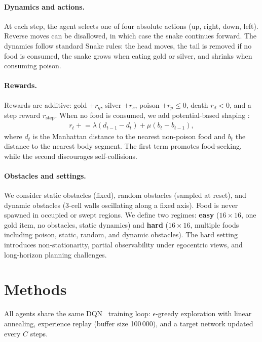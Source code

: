 \documentclass[runningheads]{llncs}
\begin{document}
\paragraph{Dynamics and actions.}
At each step, the agent selects one of four absolute actions (up, right, down,
left). Reverse moves can be disallowed, in which case the snake continues
forward. The dynamics follow standard Snake rules: the head moves, the tail is
removed if no food is consumed, the snake grows when eating gold or silver,
and shrinks when consuming poison.

\paragraph{Rewards.}
Rewards are additive: gold $+r_g$, silver $+r_s$, poison $+r_p \leq 0$, death
$r_d < 0$, and a step reward $r_{\text{step}}$. When no food is consumed, we
add potential-based shaping \cite{ng1999policy}:
\begin{align}
r_t \mathrel{+}= \lambda (d_{t-1} - d_t) + \mu (b_t - b_{t-1}),
\end{align}
where $d_t$ is the Manhattan distance to the nearest non-poison food and $b_t$
the distance to the nearest body segment. The first term promotes food-seeking,
while the second discourages self-collisions.

\paragraph{Obstacles and settings.}
We consider static obstacles (fixed), random obstacles (sampled at reset), and
dynamic obstacles (3-cell walls oscillating along a fixed axis). Food is never
spawned in occupied or swept regions. We define two regimes:
\textbf{easy} ($16 \times 16$, one gold item, no obstacles, static dynamics)
and \textbf{hard} ($16 \times 16$, multiple foods including poison, static,
random, and dynamic obstacles). The hard setting introduces non-stationarity,
partial observability under egocentric views, and long-horizon planning
challenges.
\section{Methods}
\label{sec:methods}

All agents share the same DQN~\cite{mnih2015human} training loop: $\epsilon$-greedy exploration with
linear annealing, experience replay (buffer size 100\,000), and a target
network updated every $C$ steps.
\end{document}
